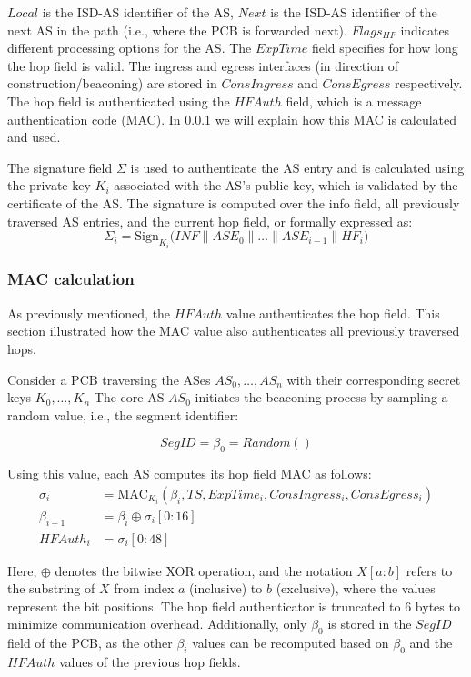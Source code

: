 $Local$ is the ISD-AS identifier of the AS, $Next$ is the ISD-AS identifier of the next AS in the path (i.e., where the PCB is forwarded next).
$Flags_{HF}$ indicates different processing options for the AS.
The $ExpTime$ field specifies for how long the hop field is valid.
The ingress and egress interfaces (in direction of construction/beaconing) are stored in $ConsIngress$ and $ConsEgress$ respectively.
The hop field is authenticated using the $HFAuth$ field, which is a message authentication code (MAC).
In \cref{sec:mac_calc} we will explain how this MAC is calculated and used.

The signature field $\Sigma$ is used to authenticate the AS entry and is calculated using the private key $K_i$ associated with the AS's public key, which is validated by the certificate of the AS.
The signature is computed over the info field, all previously traversed AS entries, and the current hop field, or formally expressed as:
$$\Sigma_i = \text{Sign}_{K_i} \bigl( INF \parallel ASE_0 \parallel \dots \parallel ASE_{i-1} \parallel HF_i \bigr)$$

\subsubsection{MAC calculation}
\label{sec:mac_calc}
As previously mentioned, the $HFAuth$ value authenticates the hop field.
This section illustrated how the MAC value also authenticates all previously traversed hops.

Consider a PCB traversing the ASes $AS_0, \dots, AS_n$ with their corresponding secret keys $K_0, \dots, K_n$
The core AS $AS_0$ initiates the beaconing process by sampling a random value, i.e., the segment identifier:

$$ SegID = \beta_0 = Random() $$

Using this value, each AS computes its hop field MAC as follows:
\begin{align*}
    \sigma_i    &= \text{MAC}_{K_i}(\beta_i, TS, ExpTime_i, ConsIngress_i, ConsEgress_i) \\
    \beta_{i+1} &= \beta_i \oplus \sigma_i[0:16] \\
    HFAuth_i &= \sigma_i[0:48]
\end{align*}

Here, $\oplus$ denotes the bitwise XOR operation, and the notation $X[a:b]$ refers to the substring of $X$ from index $a$ (inclusive) to $b$ (exclusive), where the values represent the bit positions.
The hop field authenticator is truncated to 6 bytes to minimize communication overhead.
Additionally, only $\beta_0$ is stored in the $SegID$ field of the PCB, as the other $\beta_i$ values can be recomputed based on $\beta_0$ and the $HFAuth$ values of the previous hop fields.

